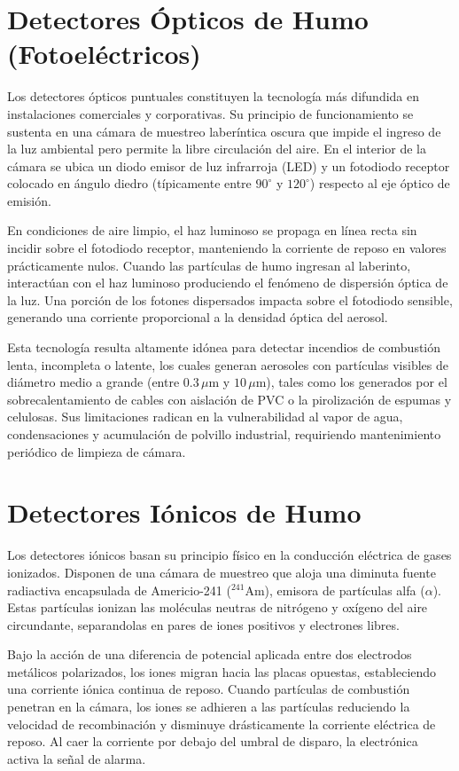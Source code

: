 \section{Detectores Ópticos de Humo (Fotoeléctricos)}

Los detectores ópticos puntuales constituyen la tecnología más difundida en instalaciones comerciales y corporativas. Su
principio de funcionamiento se sustenta en una cámara de muestreo laberíntica oscura que impide el ingreso de la luz
ambiental pero permite la libre circulación del aire. En el interior de la cámara se ubica un diodo emisor de luz
infrarroja (LED) y un fotodiodo receptor colocado en ángulo diedro (típicamente entre $90^\circ$ y $120^\circ$) respecto
al eje óptico de emisión.

En condiciones de aire limpio, el haz luminoso se propaga en línea recta sin incidir sobre el fotodiodo receptor,
manteniendo la corriente de reposo en valores prácticamente nulos. Cuando las partículas de humo ingresan al laberinto,
interactúan con el haz luminoso produciendo el fenómeno de dispersión óptica de la luz. Una porción de
los fotones dispersados impacta sobre el fotodiodo sensible, generando una corriente proporcional a la densidad óptica
del aerosol.

Esta tecnología resulta altamente idónea para detectar incendios de combustión lenta, incompleta o latente, los cuales
generan aerosoles con partículas visibles de diámetro medio a grande (entre $0.3\,\mu\mathrm{m}$ y $10\,\mu\mathrm{m}$),
tales como los generados por el sobrecalentamiento de cables con aislación de PVC o la pirolización de espumas y
celulosas. Sus limitaciones radican en la vulnerabilidad al vapor de agua, condensaciones y acumulación de polvillo
industrial, requiriendo mantenimiento periódico de limpieza de cámara.

\section{Detectores Iónicos de Humo}

Los detectores iónicos basan su principio físico en la conducción eléctrica de gases ionizados. Disponen de una cámara de
muestreo que aloja una diminuta fuente radiactiva encapsulada de Americio-241 ($^{241}\mathrm{Am}$), emisora de
partículas alfa ($\alpha$). Estas partículas ionizan las moléculas neutras de nitrógeno y oxígeno del aire circundante,
separandolas en pares de iones positivos y electrones libres.

Bajo la acción de una diferencia de potencial aplicada entre dos electrodos metálicos polarizados, los iones migran
hacia las placas opuestas, estableciendo una corriente iónica continua de reposo. Cuando partículas de combustión
penetran en la cámara, los iones se adhieren a las partículas reduciendo la velocidad de recombinación y disminuye
drásticamente la corriente eléctrica de reposo. Al caer la corriente por debajo del umbral de disparo, la electrónica
activa la señal de alarma.


